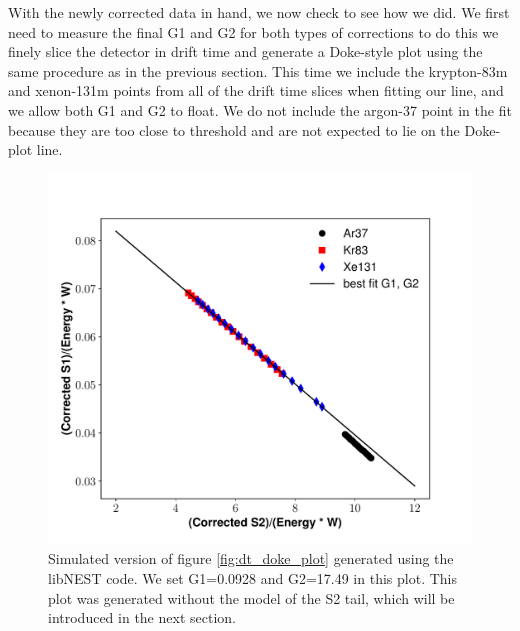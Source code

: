 With the newly corrected data in hand, we now check to see how we did. We first need to measure the final G1 and G2 for both types of corrections to do this we finely slice the detector in drift time and generate a Doke-style plot using the same procedure as in the previous section. This time we include the krypton-83m and xenon-131m points from all of the drift time slices when fitting our line, and we allow both G1 and G2 to float. We do not include the argon-37 point in the fit because they are too close to threshold and are not expected to lie on the Doke-plot line. 
\begin{figure}[h!]
\centering
\includegraphics[width=150mm]{Figures/NEST_g1g2_dcm.pdf}
\caption{Simulated version of figure \ref{fig:dt_doke_plot} generated using the libNEST code. We set G1=0.0928 and G2=17.49 in this plot. This plot was generated without the model of the S2 tail, which will be introduced in the next section.}
\label{fig:dt_doke_plot_libnest} 
\end{figure}


